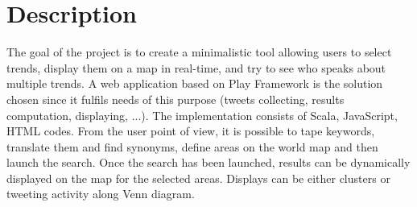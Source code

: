 \section{Description}

The goal of the project is to create a minimalistic tool allowing users to select trends, display them on a map in real-time, and try to see who speaks about multiple trends. 
A web application based on Play Framework \cite{play} is the solution chosen since it fulfils needs of this purpose (tweets collecting, results computation, displaying, ...). The implementation consists of Scala, JavaScript, HTML codes.
From the user point of view, it is possible to tape keywords, translate them and find synonyms, define areas on the world map and then launch the search. Once the search has been launched, results can be dynamically displayed on the map for the selected areas. Displays can be either clusters or tweeting activity along Venn diagram.

